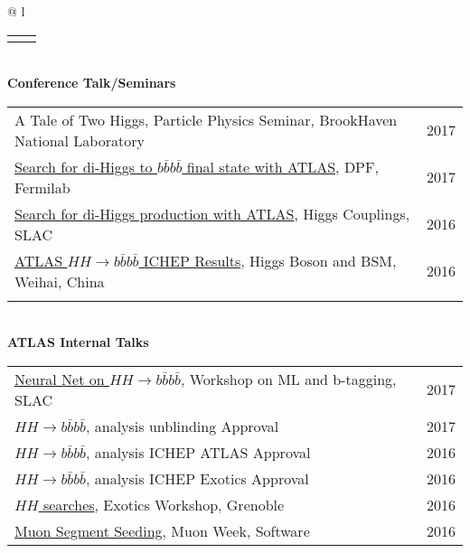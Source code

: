 \documentclass[letterpaper,11pt,oneside]{article}
\newcommand{\blue}[1]{\textcolor[rgb]{0,0,0.9}{#1}}
\begin{document}
\begin{flushleft}
\begin{tabular}{@{} l}
\begin{tabular}{@{} l l }
    
    \hspace{0.8\linewidth} & \hspace{0.1\linewidth} \\
     \end{tabular}
     \\
     \textbf{Conference Talk/Seminars} \\
     \begin{tabular}{@{} l l }
     A Tale of Two Higgs, Particle Physics Seminar, BrookHaven National Laboratory & 2017\\
     \blue{\href{https://indico.fnal.gov/contributionDisplay.py?contribId=70&confId=11999}{Search for di-Higgs to $b\bar{b}b\bar{b}$ final state with ATLAS}}, DPF, Fermilab & 2017\\
     \blue{\href{http://indico.cern.ch/event/477407/contributions/2295628/}{Search for di-Higgs production with ATLAS}}, Higgs Couplings, SLAC & 2016\\
     \blue{\href{http://indico.ihep.ac.cn/event/5635/session/86/contribution/40}{ATLAS $HH\to b\bar{b}b\bar{b}$ ICHEP Results}}, Higgs Boson and BSM, Weihai, China & 2016\\
    \hspace{0.8\linewidth} & \hspace{0.1\linewidth} \\
      \end{tabular}
     \\
     \textbf{ATLAS Internal Talks} \\
     \begin{tabular}{@{} l l }
     \blue{\href{https://indico.cern.ch/event/615994/contributions/2607475}{Neural Net on $HH\to b\bar{b}b\bar{b}$}}, Workshop on ML and b-tagging, SLAC & 2017 \\
     \blue{\href{https://indico.cern.ch/event/628586/contributions/2647498}{$HH\to b\bar{b}b\bar{b}$}}, analysis unblinding Approval & 2017 \\
     \blue{\href{https://indico.cern.ch/event/558982/contributions/2255258}{$HH\to b\bar{b}b\bar{b}$}}, analysis ICHEP ATLAS Approval & 2016\\
     \blue{\href{https://indico.cern.ch/event/556566/contributions/2244051}{$HH\to b\bar{b}b\bar{b}$}}, analysis ICHEP Exotics Approval & 2016\\
     \blue{\href{https://indico.cern.ch/event/465157/contributions/1972449}{$HH$ searches}}, Exotics Workshop, Grenoble & 2016\\
      \blue{\href{https://indico.cern.ch/event/570115/contributions/2305843}{Muon Segment Seeding}}, Muon Week, Software & 2016\\

\end{tabular}
\end{tabular}
\end{flushleft}
\end{document}

